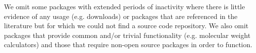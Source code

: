 We omit some packages with extended periods of inactivity where there is little evidence of any usage (e.g. downloads) or packages that are referenced in the literature but for which we could not find a source code repository.  We also omit packages that provide common and/or trivial functionality (e.g. molecular weight calculators) and those that require non-open source packages in order to function.



 
 

  
  